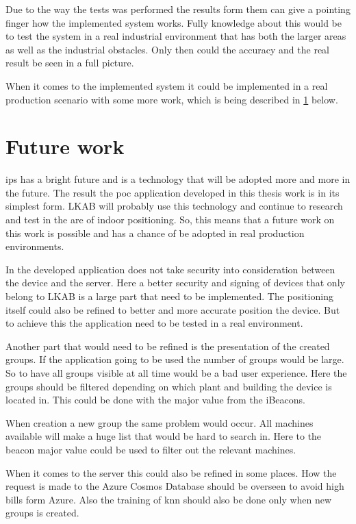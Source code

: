 Due to the way the tests was performed the results form them can give a pointing finger how the implemented system works.
Fully knowledge about this would be to test the system in a real industrial environment that has both the larger areas as well as the industrial obstacles.
Only then could the accuracy and the real result be seen in a full picture.

\bigskip

When it comes to the implemented system it could be implemented in a real production scenario with some more work, which is being described in \cref{sec:conclusionFutureWork} below.


\section{Future work}\label{sec:conclusionFutureWork}
\Acrlong{ips} has a bright future and is a technology that will be adopted more and more in the future.
The result the \acrlong{poc} application developed in this thesis work is in its simplest form.
LKAB will probably use this technology and continue to research and test in the are of indoor positioning.
So, this means that a future work on this work is possible and has a chance of be adopted in real production environments.

\bigskip

In the developed application does not take security into consideration between the device and the server.
Here a better security and signing of devices that only belong to LKAB is a large part that need to be implemented.
The positioning itself could also be refined to better and more accurate position the device. 
But to achieve this the application need to be tested in a real environment.

\bigskip

Another part that would need to be refined is the presentation of the created groups.
If the application going to be used the number of groups would be large.
So to have all groups visible at all time would be a bad user experience.
Here the groups should be filtered depending on which plant and building the device is located in.
This could be done with the major value from the iBeacons.

\bigskip

When creation a new group the same problem would occur.
All machines available will make a huge list that would be hard to search in.
Here to the beacon major value could be used to filter out the relevant machines.

\bigskip

When it comes to the server this could also be refined in some places.
How the request is made to the Azure Cosmos Database should be overseen to avoid high bills form Azure.
Also the training of \acrlong{knn} should also be done only when new groups is created.
